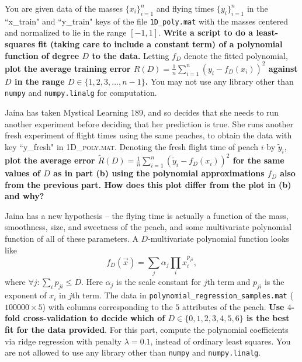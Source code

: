 \documentclass[preview]{standalone}
\begin{document}
\begin{Parts}




\Part You are given data of the masses $\{x_i\}_{i=1}^n$ and flying times $\{y_i\}_{i=1}^n$ in the
``x\_train" and ``y\_train" keys of the file \texttt{1D\_poly.mat} with the masses centered and
normalized to lie in the range $[-1, 1]$. {\bf Write a script to do a least-squares fit (taking
care to include a constant term) of a polynomial function of degree $D$ to the data.} Letting $f_D$
denote the fitted polynomial, {\bf plot the average training error $R(D) = \frac{1}{n} \sum_{i=1}^n
(y_i - f_D(x_i))^2$ against $D$ in the range $D \in \{1, 2, 3, \ldots, n-1\}$.}  You may not use
any library other than \texttt{numpy} and \texttt{numpy.linalg} for computation.






\Part Jaina has taken Mystical Learning 189, and so decides that she needs to run another
experiment before deciding that her prediction is true. She runs another fresh experiment of flight
times using the same peaches, to obtain the data with key ``y\_fresh" in \textsc{1D\_poly.mat}.
Denoting the fresh flight time of peach $i$ by $\tilde{y}_i$, {\bf plot the average error
$\tilde{R}(D) = \frac{1}{n} \sum_{i=1}^n (\tilde{y}_i - f_D(x_i))^2$ for the same values of $D$ as
in part (b) using the polynomial approximations $f_D$ also from the previous part. How does this
plot differ from the plot in (b) and why?}






\Part Jaina has a new hypothesis -- the flying time is actually a function of the mass, smoothness,
size, and sweetness of the peach, and some multivariate polynomial function of all of these
parameters. A $D$-multivariate polynomial function looks like
\[
f_D(\vec x) = \sum_{j}  \alpha_j\prod_i x_i^{p_{ji}},
\]
where $\forall j:\sum_i p_{ji} \le D$.  Here $\alpha_j$ is the scale constant for $j$th term and
$p_{ji}$ is the exponent of $x_i$ in $j$th term. The data in
\texttt{polynomial\_regression\_samples.mat} ($100000 \times 5$) with columns corresponding to the
$5$ attributes of the peach. {\bf Use $4$-fold cross-validation to decide which of $D \in \{0, 1,
2, 3, 4, 5, 6\}$ is the best fit for the data provided}. For this part, compute the polynomial
coefficients via ridge regression with penalty $\lambda = 0.1$, instead of ordinary least squares.
You are not allowed to use any library other than \texttt{numpy} and \texttt{numpy.linalg}.




\end{Parts}
\end{document}
